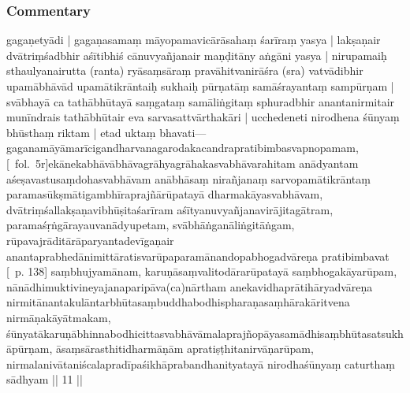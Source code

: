 \documentclass[12pt]{article}
\newcommand{\emdash} {\hspace{0em}—\hspace{0em}}
\begin{document}
\subsubsection{Commentary}
gagaṇetyādi | gagaṇasamaṃ māyopamavicārāsahaṃ śarīraṃ yasya | lakṣaṇair dvātriṃśadbhir aśītibhiś cānuvyañjanair maṇḍitāny aṅgāni yasya | nirupamaiḥ sthaulyanairutta (ranta) ryāsaṃsāraṃ pravāhitvanirāśra (sra) vatvādibhir upamābhāvād upamātikrāntaiḥ sukhaiḥ pūrṇatāṃ samāśrayantaṃ sampūrṇam | svābhayā ca tathābhūtayā saṃgataṃ samāliṅgitaṃ sphuradbhir anantanirmitair munīndrais tathābhūtair eva sarvasattvārthakāri | ucchedeneti nirodhena śūnyaṃ bhūsthaṃ riktam | etad uktaṃ bhavati\emdash gaganamāyāmarīcigandharvanagarodakacandrapratibimbasvapnopamam, [\MS\ fol.\ 5r]ekānekabhāvābhāvagrāhyagrāhakasvabhāvarahitam anādyantam aśeṣavastusaṃdohasvabhāvam anābhāsaṃ nirañjanaṃ sarvopamātikrāntaṃ paramasūkṣmātigambhīraprajñārūpatayā dharmakāyasvabhāvam, dvātriṃśallakṣaṇavibhūṣitaśarīram aśītyanuvyañjanavirājitagātram, paramaśṛṅgārayauvanādyupetam, svābhāṅganāliṅgitāṅgam, rūpavajrāditārāparyantadevīgaṇair anantaprabhedānimittāratisvarūpaparamānandopabhogadvāreṇa pratibimbavat [\EDD\ p. 138] saṃbhujyamānam, karuṇāsaṃvalitodārarūpatayā saṃbhogakāyarūpam, nānādhimuktivineyajanaparipāva(ca)nārtham anekavidhaprātihāryadvāreṇa nirmitānantakulāntarbhūtasaṃbuddhabodhispharaṇasaṃhārakāritvena nirmāṇakāyātmakam, śūnyatākaruṇābhinnabodhicittasvabhāvāmalaprajñopāyasamādhisaṃbhūtasatsukhāpūrṇam, āsaṃsārasthitidharmāṇām apratiṣṭhitanirvāṇarūpam, nirmalanivātaniścalapradīpaśikhāprabandhanityatayā nirodhaśūnyaṃ caturthaṃ sādhyam || 11 ||\\
\end{document}
